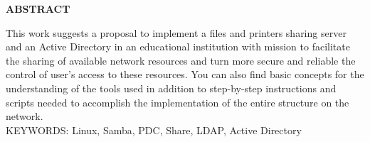 \begin{center}
\textbf{ABSTRACT}
\end{center}

\singlespacing

\noindent This work suggests a proposal to implement a files and printers sharing server and an Active Directory in an educational institution with mission to facilitate the sharing of available network resources and turn more secure and reliable the control of user's access to these resources. You can also find basic concepts for the understanding of the tools used in addition to step-by-step instructions and scripts
needed to accomplish the implementation of the entire structure on the network.\\

\noindent KEYWORDS: Linux, Samba, PDC, Share, LDAP, Active Directory
